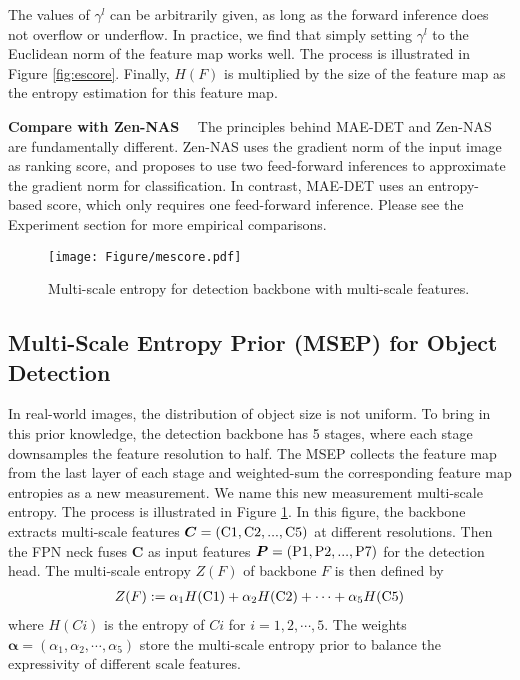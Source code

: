 \documentclass[nohyperref]{article}
\theoremstyle{plain}
\theoremstyle{definition}
\theoremstyle{remark}
\begin{document}
The values of $\gamma^l$ can be arbitrarily given, as long as the forward inference does not overflow or underflow. In practice, we find that simply setting $\gamma^l$ to the Euclidean norm of the feature map works well. The process is illustrated in Figure \ref{fig:escore}. Finally, $H(F)$ is multiplied by the size of the feature map as the entropy estimation for this feature map.

\noindent\textbf{Compare with Zen-NAS}$\quad$ The principles behind MAE-DET and Zen-NAS are fundamentally different. 
Zen-NAS uses the gradient norm of the input image as ranking score, and proposes to use two feed-forward inferences to approximate the gradient norm for classification. In contrast, MAE-DET uses an entropy-based score, which only requires one feed-forward inference. Please see the Experiment section for more empirical comparisons.


\begin{figure}[tb]
	\centering
	\texttt{[image: Figure/mescore.pdf]}
	\caption{Multi-scale entropy for detection backbone with multi-scale features.}
	\label{fig:mescore}	
\end{figure}
\subsection{Multi-Scale Entropy Prior (MSEP) for Object Detection}\label{sub:msep}
In real-world images, the distribution of object size is not uniform. To bring in this prior knowledge, the detection backbone has 5 stages, where each stage downsamples the feature resolution to half. The MSEP collects the feature map from the last layer of each stage and weighted-sum the corresponding feature map entropies as a new measurement. We name this new measurement multi-scale entropy. The process is illustrated in Figure \ref{fig:mescore}. In this figure, the backbone extracts multi-scale features $\boldsymbol{C} = ({\rm C}1, {\rm C}2, ..., {\rm C}5)$ at different resolutions. Then the FPN neck fuses $\boldsymbol{C}$ as input features $\boldsymbol{P} = ({\rm P}1, {\rm P}2, ..., {\rm P}7)$ for the detection head. The multi-scale entropy $Z(F)$ of backbone $F$ is then defined by
\begin{align}
	\label{eq:MSEP-score}
	{Z(F)} := \alpha_1 H({\rm C}1) + \alpha_2 H({\rm C}2) + \cdots + \alpha_5 H({\rm C}5)
\end{align}
where $H(Ci)$ is the entropy of $Ci$ for $i=1,2,\cdots,5$. The weights $\boldsymbol{\alpha}=(\alpha_1, \alpha_2, \cdots, \alpha_5)$ store the multi-scale entropy prior to balance the expressivity of different scale features. 
\end{document}
